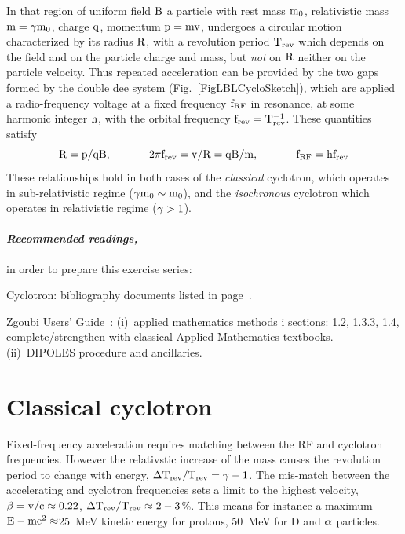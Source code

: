 In that region of uniform field $\rm B$ a  particle with rest mass $\rm m_0$, 
relativistic mass $\rm m=\gamma m_0$, charge $\rm q$, momentum $\rm p=mv$, undergoes a circular motion
characterized by its radius $\rm \rm R$, with a revolution period $\rm T_{\rm rev}$ which depends on the field 
and on the particle charge and mass, but \emph{not} on $\rm R$ neither on the particle velocity. 
Thus repeated acceleration can be provided by the two gaps formed by the double dee system (Fig.~\ref{FigLBLCycloSketch}), 
which are applied a radio-frequency voltage at a fixed frequency $\rm f_{\rm RF}$ in resonance, at some harmonic integer $\rm h$, 
 with the orbital frequency $\rm f_{\rm rev}=T^{-1}_{\rm rev}$. These  quantities satisfy
\begin{equation} \rm
\label{EqRCyclo}
 R = p / qB, \hspace{.1\linewidth} 2\pi f_{\rm rev} = v/R = q B / m, \hspace{.1\linewidth} f_{\rm RF} = h f_{\rm rev}
\end{equation}
These relationships hold in both cases of the  \emph{classical} cyclotron, which  operates in 
 sub-relativistic regime ($\rm \gamma m_0\sim m_0$), 
and the \emph{isochronous} cyclotron which operates in  relativistic regime ($\rm \gamma >1$).  


\paragraph {\sl Recommended readings,} in order to prepare this exercise series:

Cyclotron: bibliography documents listed in page~\pageref{SecBiblioCyclotron}.

Zgoubi Users' Guide~: (i)~applied mathematics methods i sections: 1.2, 1.3.3, 1.4,  
complete/strengthen with classical Applied Mathematics textbooks. (ii)~DIPOLES procedure and ancillaries.



\section{Classical cyclotron \label{secCycloClass}}

Fixed-frequency acceleration requires  matching between the RF and cyclotron frequencies. 
However the relativstic increase of the mass causes 
 the revolution period to change with energy, $\rm \Delta T_{\rm rev}/T_{\rm rev} = \gamma-1 $.  
The mis-match between the accelerating and cyclotron frequencies 
sets a limit to the highest velocity, $\rm \beta=v/c\approx 0.22$,  $\rm \Delta T_{\rm rev}/T_{\rm rev} \approx 2-3$\%.  
This means for instance 
a maximum $\rm E-mc^2 \approx$25~MeV kinetic energy for protons, 50~MeV for D and $\rm \alpha$ particles. 

